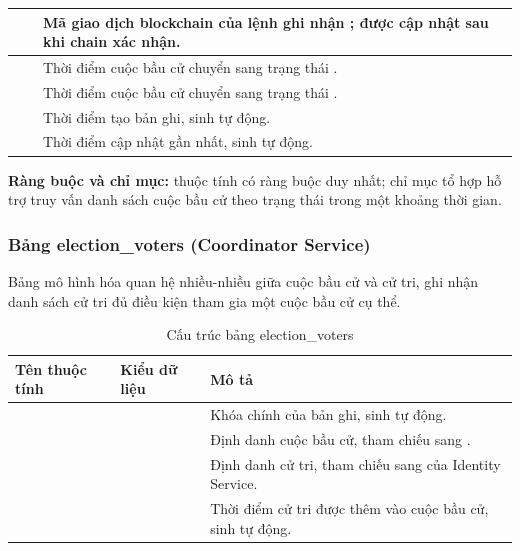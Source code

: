 \begin{table}[H]
\begin{tabularx}{\textwidth}{|L{0.25}|L{0.25}|L{0.50}|}
           &    & Mã giao dịch blockchain của lệnh ghi nhận ; được cập nhật sau khi chain xác nhận. \\ \hline
               &  & Thời điểm cuộc bầu cử chuyển sang trạng thái . \\ \hline
                 &  & Thời điểm cuộc bầu cử chuyển sang trạng thái . \\ \hline
               &   & Thời điểm tạo bản ghi, sinh tự động. \\ \hline
               &   & Thời điểm cập nhật gần nhất, sinh tự động. \\ \hline
    \end{tabularx}
\end{table}

\textbf{Ràng buộc và chỉ mục:} thuộc tính  có ràng buộc duy nhất; chỉ mục tổ hợp  hỗ trợ truy vấn danh sách cuộc bầu cử theo trạng thái trong một khoảng thời gian.

\subsubsection{Bảng {election\_voters} (Coordinator Service)}

Bảng  mô hình hóa quan hệ nhiều-nhiều giữa cuộc bầu cử và cử tri, ghi nhận danh sách cử tri đủ điều kiện tham gia một cuộc bầu cử cụ thể.

\begin{table}[H]
    \centering
    \small
    \setlength{\tabcolsep}{3pt}
    \caption{Cấu trúc bảng {election\_voters}}
    \label{tab:db-election-voters}
    \begin{tabularx}{\textwidth}{|L{0.25}|L{0.25}|L{0.50}|}
    \hline
    \textbf{Tên thuộc tính} & \textbf{Kiểu dữ liệu} & \textbf{Mô tả} \\
    \hline
             &   & Khóa chính của bản ghi, sinh tự động. \\ \hline
     &   & Định danh cuộc bầu cử, tham chiếu sang . \\ \hline
        &   & Định danh cử tri, tham chiếu sang  của Identity Service. \\ \hline
      &   & Thời điểm cử tri được thêm vào cuộc bầu cử, sinh tự động. \\ \hline
    \end{tabularx}
\end{table}


